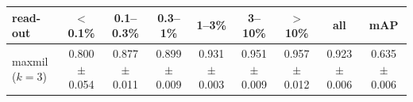 \begin{tabular}{lcccccccc}
\toprule
read-out & $<$0.1\% & 0.1--0.3\% & 0.3--1\% & 1--3\% & 3--10\% & $>$10\% & all & mAP \\
\midrule
maxmil ($k=3$) & 0.800 $\pm$ 0.054 & 0.877 $\pm$ 0.011 & 0.899 $\pm$ 0.009 & 0.931 $\pm$ 0.003 & 0.951 $\pm$ 0.009 & 0.957 $\pm$ 0.012 & 0.923 $\pm$ 0.006 & 0.635 $\pm$ 0.006 \\
\bottomrule
\end{tabular}
